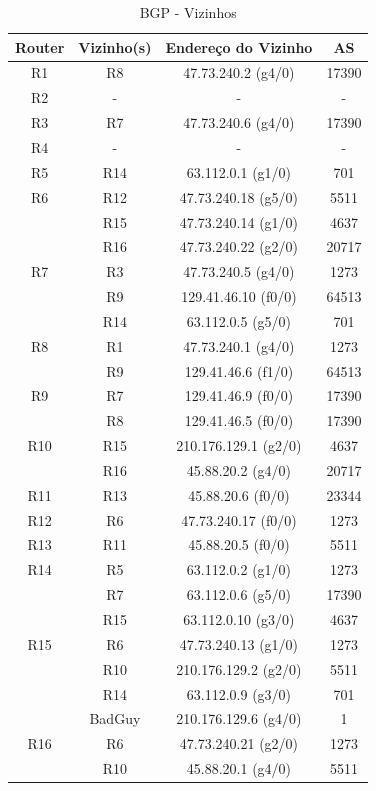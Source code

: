 \documentclass[11pt,english, openright, oneside]{book}
\begin{document}
\begin{table}[!ht]
  \centering
  \caption{BGP - Vizinhos}
  \begin{tabular}{|c|c|c|c|}
  \hline
      \textbf{ Router} & \textbf{ Vizinho(s)} & \textbf{ Endereço do Vizinho} & \textbf{ AS} \\ \hline
      R1 & R8 & 47.73.240.2 (g4/0) & 17390 \\ \hline
      R2 & - & - & - \\ \hline
      R3 & R7 & 47.73.240.6 (g4/0) & 17390 \\ \hline
      R4 & - & - & - \\ \hline
      R5 & R14 & 63.112.0.1 (g1/0) & 701 \\ \hline
      R6 & R12 & 47.73.240.18 (g5/0) & 5511 \\
      ~ & R15 & 47.73.240.14 (g1/0) & 4637 \\
      ~ & R16 & 47.73.240.22 (g2/0) & 20717 \\ \hline
      R7 & R3 & 47.73.240.5 (g4/0) & 1273 \\
      ~ & R9 & 129.41.46.10  (f0/0) & 64513 \\
      ~ & R14 & 63.112.0.5 (g5/0) & 701 \\ \hline
      R8 & R1 & 47.73.240.1 (g4/0) & 1273 \\
      ~ & R9 & 129.41.46.6 (f1/0) & 64513 \\ \hline
      R9 & R7 & 129.41.46.9 (f0/0) & 17390 \\
      ~ & R8 & 129.41.46.5 (f0/0) & 17390 \\ \hline
      R10 & R15 & 210.176.129.1 (g2/0) & 4637 \\
      ~ & R16 & 45.88.20.2 (g4/0) & 20717 \\ \hline
      R11 & R13 & 45.88.20.6 (f0/0) & 23344 \\ \hline
      R12 & R6 & 47.73.240.17 (f0/0) & 1273 \\ \hline
      R13 & R11 & 45.88.20.5 (f0/0) & 5511 \\ \hline
      R14 & R5 & 63.112.0.2 (g1/0) & 1273 \\
      ~ & R7 & 63.112.0.6 (g5/0) & 17390 \\
      ~ & R15 & 63.112.0.10 (g3/0) & 4637 \\ \hline
      R15 & R6 & 47.73.240.13 (g1/0) & 1273 \\
      ~ & R10 & 210.176.129.2 (g2/0) & 5511 \\
      ~ & R14 & 63.112.0.9 (g3/0) & 701 \\
      ~ & BadGuy & 210.176.129.6 (g4/0) & 1 \\ \hline
      R16 & R6 & 47.73.240.21 (g2/0) & 1273 \\
      ~ & R10 & 45.88.20.1 (g4/0) & 5511 \\ \hline
  \end{tabular}
\end{table}
\end{document}

